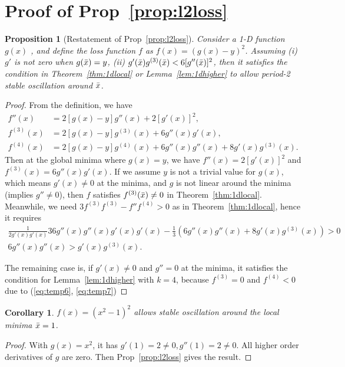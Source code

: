 \documentclass{article}
\theoremstyle{plain}
\newtheorem{coro}{Corollary}
\newtheorem{prop}{Proposition}
\theoremstyle{remark}
\newcommand{\red}[1]{{\color{black}#1}}
\newcommand{\T}[1]{^{(#1)}}
\begin{document}
\section{Proof of Prop~\ref{prop:l2loss}}
\label{app:l2loss}

\begin{prop}[Restatement of Prop~\ref{prop:l2loss}]
Consider a 1-D function $g(x)$ , and define the loss function $f$ as $f(x) = (g(x)-y)^2$. Assuming (i) $g'$ is not zero when $g(\Bar{x})=y$, (ii) $g'(\Bar{x})g\T{3}(\Bar{x}) < 6[g''(\Bar{x})]^2$, then it satisfies the condition in Theorem~\ref{thm:1dlocal} or Lemma~\ref{lem:1dhigher} to allow period-2 stable oscillation around $\Bar{x}$. 
\end{prop}

\begin{proof}
From the definition, we have
\begin{align}
    f''(x) &= 2[g(x)-y]g''(x) + 2[g'(x)]^2, \\
    f\T{3}(x) &= 2[g(x)-y]g\T{3}(x)+6 g''(x) g'(x),\\
    f\T{4}(x) &= 2[g(x)-y]g\T{4}(x)+6 g''(x)g''(x)+8g'(x)g\T{3}(x). \label{eq:temp6}
\end{align}
Then at the global minima where $g(x)=y$, we have $f''(x)=2[g'(x)]^2$ and $f\T{3}(x)=6g''(x)g'(x)$. If we assume $y$ is not a trivial value for $g(x)$, which means $g'(x)\neq 0$ at the minima, and $g$ is not linear around the minima (implies $g''\neq 0$), then $f$ satisfies $f\T{3}(\Bar{x})\neq 0$ in Theorem~\ref{thm:1dlocal}. Meanwhile, we need $3f\T{3}f\T{3}-f''f\T{4}>0$ as in Theorem~\ref{thm:1dlocal}, hence it requires
\begin{gather}
    \frac{1}{2g'(x)g'(x)}36g''(x)g''(x)g'(x)g'(x)-\frac{1}{3}\left(6g''(x)g''(x)+8g'(x)g\T{3}(x)\right)>0\\
    6g''(x)g''(x)>g'(x)g\T{3}(x). \label{eq:temp7}
\end{gather}

The remaining case is, if $g'(x)\neq 0$ and $g''=0$ at the minima, it satisfies the condition for Lemma~\ref{lem:1dhigher} with $k=4$, because $f\T{3}=0$ and $f\T{4}<0$ due to (\ref{eq:temp6}, \ref{eq:temp7})
\end{proof}

\begin{coro}
$f(x)=(x^2-1)^2$ allows stable oscillation around the local minima $\Bar{x}=1$.
\label{cor:x2}
\end{coro}
\begin{proof}
With $g(x)=x^2$, it has $g'(1)=2\neq0, g''(1)=2\neq0$. All higher order derivatives of $g$ are zero. Then Prop~\ref{prop:l2loss} gives the result.
\end{proof}
\end{document}
